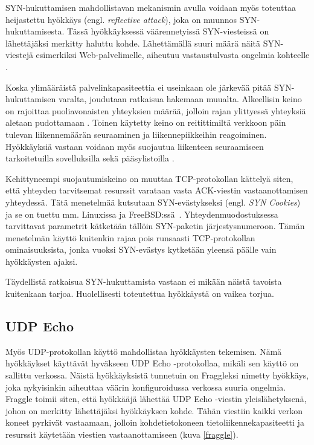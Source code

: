 SYN-hukuttamisen mahdollistavan mekanismin avulla voidaan myös toteuttaa
heijastettu hyökkäys (engl. \textit{reflective attack}), joka on muunnos 
SYN-hukuttamisesta. Tässä hyökkäyksessä väärennetyissä SYN-viesteissä on
lähettäjäksi merkitty haluttu kohde. Lähettämällä suuri määrä näitä SYN-viestejä 
esimerkiksi Web-\-palvelimelle, aiheutuu vastaustulvasta ongelmia
kohteelle \cite{STACK}.

Koska ylimääräistä palvelinkapasiteettia ei useinkaan ole järkevää
pitää SYN-\-hukuttamisen varalta, joudutaan ratkaisua
hakemaan muualta. Alkeellisin keino on rajoittaa puoliavonaisten
yhteyksien määrää, jolloin rajan ylittyessä yhteyksiä aletaan
pudottamaan \cite{TCP}. Toinen käytetty keino on reitittimiltä
verkkoon päin tulevan liikennemäärän seuraaminen ja liikennepiikkeihin
reagoiminen. Hyökkäyksiä vastaan voidaan myös suojautua liikenteen
seuraamiseen tarkoitetuilla sovelluksilla sekä pääsylistoilla
\cite{STACK}.

Kehittyneempi suojautumiskeino on muuttaa TCP-protokollan kättelyä
siten, että yhteyden tarvitsemat resurssit varataan vasta ACK-viestin
vastaanottamisen yhteydessä. Tätä menetelmää kutsutaan
SYN-evästykseksi (engl. \textit{SYN Cookies}) ja se on tuettu
mm. Linuxissa ja FreeBSD:ssä~\cite{syncookies}. Yhteydenmuodostuksessa
tarvittavat parametrit kätketään tällöin SYN-paketin
järjestysnumeroon. Tämän menetelmän käyttö kuitenkin rajaa pois
runsaasti TCP-protokollan ominaisuuksista, jonka vuoksi SYN-evästys
kytketään yleensä päälle vain hyökkäysten ajaksi.

Täydellistä ratkaisua SYN-hukuttamista vastaan ei mikään näistä
tavoista kuitenkaan tarjoa. Huolellisesti toteutettua hyökkäystä on
vaikea torjua.

\subsection{UDP Echo}

Myös UDP-protokollan käyttö mahdollistaa hyökkäysten tekemisen. Nämä
hyökkäykset käyttävät hyväkseen UDP Echo -protokollaa, mikäli sen
käyttö on sallittu verkossa. Näistä hyökkäyksistä tunnetuin on
Fraggleksi nimetty hyökkäys, joka nykyisinkin aiheuttaa väärin
konfiguroidussa verkossa suuria ongelmia.  Fraggle toimii siten, että
hyökkääjä lähettää UDP Echo -viestin yleislähetyksenä, johon on
merkitty lähettäjäksi hyökkäyksen kohde. Tähän viestiin kaikki verkon
koneet pyrkivät vastaamaan, jolloin kohdetietokoneen
tietoliikennekapasiteetti ja resurssit käytetään viestien
vastaanottamiseen (kuva \ref{fraggle}).

